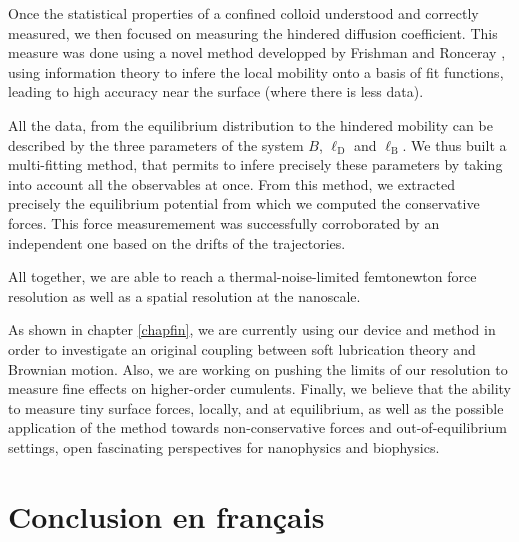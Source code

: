 Once the statistical properties of a confined colloid understood and correctly measured, we then focused on measuring the hindered diffusion coefficient. This measure was done using a novel method developped by Frishman and Ronceray \cite{frishman_learning_2020}, using information theory to infere the local mobility onto a basis of fit functions, leading to high accuracy near the surface (where there is less data). 

All the data, from the equilibrium distribution to the hindered mobility can be described by the three parameters of the system $B$, $\ell _\mathrm{D}$ and $\ell_\mathrm{B}$. We thus built a multi-fitting method, that permits to infere precisely these parameters by taking into account all the observables at once. From this method, we extracted precisely the equilibrium potential from which we computed the conservative forces. This force measuremement was successfully corroborated by an independent one based on the drifts of the trajectories.

All together, we are able to reach a thermal-noise-limited femtonewton force resolution as well as a spatial resolution at the nanoscale.

As shown in chapter \ref{chapfin}, we are currently using our device and method in order to investigate an original coupling between soft lubrication theory and Brownian motion. Also, we are working on pushing the limits of our resolution to measure fine effects on higher-order cumulents. Finally, we believe that the ability to measure tiny surface forces, locally, and at equilibrium, as well as the possible application of the method towards non-conservative forces and out-of-equilibrium settings, open fascinating perspectives for nanophysics and biophysics.



\newpage

\section{Conclusion en français}

